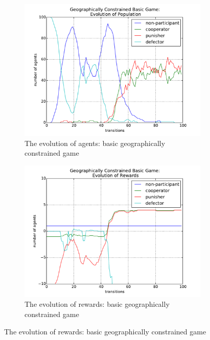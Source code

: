 \documentclass[11pt]{article}
\begin{document}
\begin{figure}[!h]
 \caption{Basic geographically constrained game}
 \begin{subfigure}{.5\textwidth}
   \centering
   \caption{The evolution of agents: basic geographically constrained game}
   \includegraphics[scale = 0.4]{4.pdf}
 \end{subfigure}
 \begin{subfigure}{.5\textwidth}
   \centering
   \label{}
   \caption{The evolution of rewards: basic geographically constrained game}
   \includegraphics[scale = 0.4]{5.pdf}
 \end{subfigure}
\end{figure}
\end{document}

